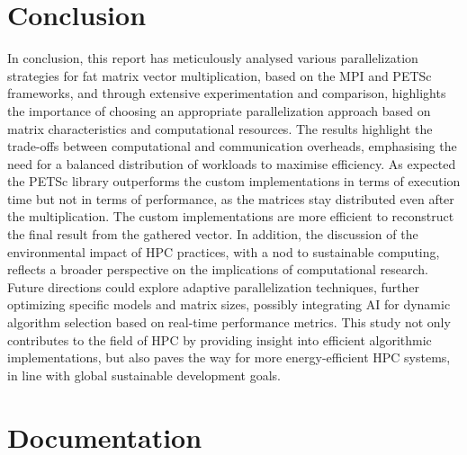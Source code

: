 \documentclass[12pt,oneside]{book} %
\begin{document}
\chapter{Conclusion}

In conclusion, this report has meticulously analysed various parallelization
strategies for fat matrix vector multiplication, based on the MPI and PETSc
frameworks, and through extensive experimentation and comparison, highlights
the importance of choosing an appropriate parallelization approach based on
matrix characteristics and computational resources. The results highlight the
trade-offs between computational and communication overheads, emphasising the
need for a balanced distribution of workloads to maximise efficiency. As
expected the PETSc library outperforms the custom implementations in terms of
execution time but not in terms of performance, as the matrices stay
distributed even after the multiplication. The custom implementations are more
efficient to reconstruct the final result from the gathered vector. In
addition, the discussion of the environmental impact of HPC practices, with a
nod to sustainable computing, reflects a broader perspective on the
implications of computational research. Future directions could explore
adaptive parallelization techniques, further optimizing specific models and
matrix sizes, possibly integrating AI for dynamic algorithm selection based on
real-time performance metrics. This study not only contributes to the field of
HPC by providing insight into efficient algorithmic implementations, but also
paves the way for more energy-efficient HPC systems, in line with global
sustainable development goals.




\appendix
\chapter{Documentation}
\end{document}
